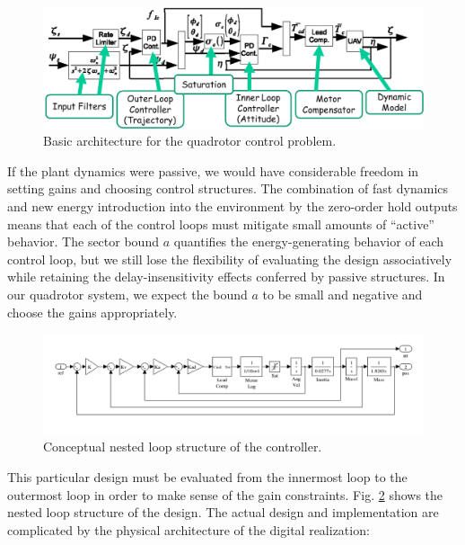 \begin{figure}[htb]
\centering
\includegraphics[width=1.75\columnwidth]{figures/quadrotor_arch}
    \caption{Basic architecture for the quadrotor control problem\cite{quad:passcontrol}.}
    \label{fig:quadrotor}
\end{figure}


If the plant dynamics were passive, we would have considerable freedom in setting gains and
choosing control structures.  The combination of fast dynamics and new energy introduction
into the environment by the zero-order hold outputs means that each of the control loops must 
mitigate small amounts of ``active'' behavior.  The sector bound $a$ quantifies the 
energy-generating behavior of each control loop, but we still lose the flexibility of 
evaluating the design associatively while retaining the delay-insensitivity effects conferred
by passive structures. In our quadrotor system, we expect the bound $a$ to be small and 
negative and choose the gains appropriately.  

\begin{figure}[htb]
\centering
\includegraphics[width=2.2\columnwidth]{figures/quadrotor_loops}
    \caption{Conceptual nested loop structure of the controller.}
    \label{fig:quadrotor_loops}
\end{figure}


This particular design must be evaluated from the innermost loop to the outermost loop in order
to make sense of the gain constraints. Fig. \ref{fig:quadrotor_loops} shows the nested loop
structure of the design.  The actual design and implementation are complicated by the 
physical architecture of the digital realization: 

